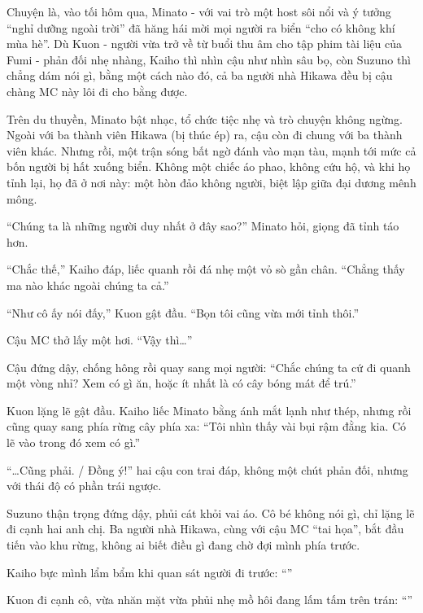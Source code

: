 \documentclass[../main.tex]{subfiles}
\begin{document}
Chuyện là, vào tối hôm qua, Minato - với vai trò một host sôi nổi và ý tưởng ``nghỉ dưỡng ngoài trời'' đã hăng hái mời mọi người ra biển ``cho có không khí mùa hè''. Dù Kuon - người vừa trở về từ buổi thu âm cho tập phim tài liệu của Fumi - phản đối nhẹ nhàng, Kaiho thì nhìn cậu như nhìn sâu bọ, còn Suzuno thì chẳng dám nói gì, bằng một cách nào đó, cả ba người nhà Hikawa đều bị cậu chàng MC này lôi đi cho bằng được.

Trên du thuyền, Minato bật nhạc, tổ chức tiệc nhẹ và trò chuyện không ngừng. Ngoài với ba thành viên Hikawa (bị thúc ép) ra, cậu còn đi chung với ba thành viên khác. Nhưng rồi, một trận sóng bất ngờ đánh vào mạn tàu, mạnh tới mức cả bốn người bị hất xuống biển. Không một chiếc áo phao, không cứu hộ, và khi họ tỉnh lại, họ đã ở nơi này: một hòn đảo không người, biệt lập giữa đại dương mênh mông.

``Chúng ta là những người duy nhất ở đây sao?'' Minato hỏi, giọng đã tỉnh táo hơn.

``Chắc thế,'' Kaiho đáp, liếc quanh rồi đá nhẹ một vỏ sò gần chân. ``Chẳng thấy ma nào khác ngoài chúng ta cả.''

``Như cô ấy nói đấy,'' Kuon gật đầu. ``Bọn tôi cũng vừa mới tỉnh thôi.''

Cậu MC thở lấy một hơi. ``Vậy thì\dots''

Cậu đứng dậy, chống hông rồi quay sang mọi người: ``Chắc chúng ta cứ đi quanh một vòng nhỉ? Xem có gì ăn, hoặc ít nhất là có cây bóng mát để trú.''

Kuon lặng lẽ gật đầu. Kaiho liếc Minato bằng ánh mắt lạnh như thép, nhưng rồi cũng quay sang phía rừng cây phía xa: ``Tôi nhìn thấy vài bụi rậm đằng kia. Có lẽ vào trong đó xem có gì.''

``\dots Cũng phải. / Đồng ý!'' hai cậu con trai đáp, không một chút phản đối, nhưng với thái độ có phần trái ngược.

Suzuno thận trọng đứng dậy, phủi cát khỏi vai áo. Cô bé không nói gì, chỉ lặng lẽ đi cạnh hai anh chị. Ba người nhà Hikawa, cùng với cậu MC ``tai họa'', bắt đầu tiến vào khu rừng, không ai biết điều gì đang chờ đợi mình phía trước.

\ct

Kaiho bực mình lẩm bẩm khi quan sát người đi trước: ``''

Kuon đi cạnh cô, vừa nhăn mặt vừa phủi nhẹ mồ hôi đang lấm tấm trên trán: ``''
\end{document}

